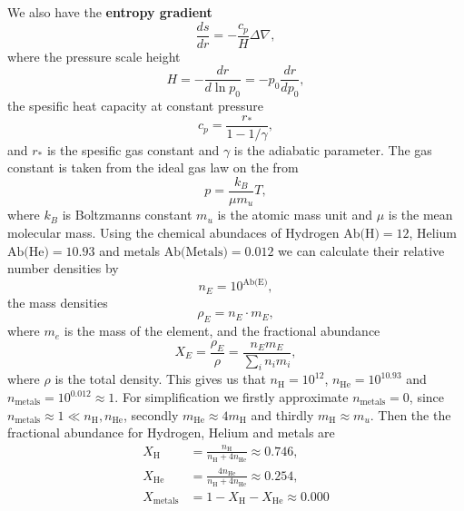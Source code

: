 We also have the \textbf{entropy gradient}
    \begin{equation*}
        \frac{ds}{dr} = -\frac{c_p}{H} \Delta\nabla,
    \end{equation*}
where the pressure scale height
    \begin{equation*}
        H = - \frac{dr}{d\ln p_0} = - p_0\frac{dr}{dp_0},
    \end{equation*}
the spesific heat capacity at constant pressure \citep{1999ApJS..121..247L}
    \begin{equation*}
        c_p = \frac{r_*}{1-1/\gamma},
    \end{equation*}
and $r_*$ is the spesific gas constant and $\gamma$ is the adiabatic parameter. The gas constant is taken from the ideal gas law on the from
    \begin{equation*}
        p = \frac{k_B}{\mu m_u} T,
    \end{equation*}
where $k_B$ is Boltzmanns constant $m_u$ is the atomic mass unit and $\mu$ is the mean molecular mass. Using the chemical abundaces of Hydrogen $\text{Ab(H)}=12$, Helium $\text{Ab(He)}=10.93$ and metals $\text{Ab(Metals)}=0.012$ \citep{2007SSRv..130..105G} we can calculate their relative number densities by 
    \begin{equation*}
        n_E = 10^{\text{Ab(E)}},
    \end{equation*}
the mass densities
    \begin{equation*}
        \rho_E = n_E\cdot m_E,
    \end{equation*}
where $m_e$ is the mass of the element, and the fractional abundance
    \begin{equation*}
        X_E = \frac{\rho_E}{\rho} = \frac{n_E m_E}{\sum_i n_i m_i},
    \end{equation*}
where $\rho$ is the total density. This gives us that $n_\text{H}=10^{12}$, $n_\text{He}=10^{10.93}$ and $n_\text{metals} = 10^{0.012}\approx1$. For simplification we firstly approximate $n_\text{metals}=0$, since $n_\text{metals}\approx1 \ll n_\text{H},n_\text{He}$, secondly $m_\text{He}\approx 4m_\text{H}$ and thirdly $m_\text{H}\approx m_u$. Then the the fractional abundance for Hydrogen, Helium and metals are
    \begin{align*}
        X_\text{H} &= \frac{n_\text{H}}{n_\text{H}+4 n_\text{He}} \approx 0.746,\\
        X_\text{He} &= \frac{4n_\text{He}}{n_\text{H}+4n_\text{He}}\approx 0.254, \\
        X_\text{metals} &= 1 - X_{\text{H}} - X_\text{He} \approx 0.000
    \end{align*}
